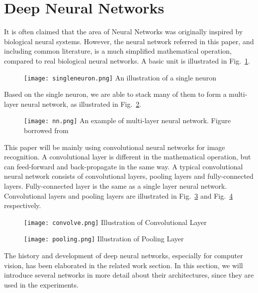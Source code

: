 \section{Deep Neural Networks}
It is often claimed that the area of Neural Networks was originally inspired by biological neural systems. However, the neural network referred in this paper, and including common literature, is a much simplified mathematical operation, compared to real biological neural networks. A basic unit is illustrated in Fig.~\ref{fig:singleneuron}.
\begin{figure}[!htp]
	\centering
	\texttt{[image: singleneuron.png]}
	{An illustration of a single neuron}
	\label{fig:singleneuron}
\end{figure}
Based on the single neuron, we are able to stack many of them to form a multi-layer neural network, as illustrated in Fig.~\ref{fig:nn}.
\begin{figure}[!htp]
	\centering
	\texttt{[image: nn.png]}
	{An example of multi-layer neural network. Figure borrowed from \cite{lecun2015deep}}
	\label{fig:nn}
\end{figure}
This paper will be mainly using convolutional neural networks for image recognition. A convolutional layer is different in the mathematical operation, but can feed-forward and back-propagate in the same way. A typical convolutional neural network consists of convolutional layers, pooling layers and fully-connected layers. Fully-connected layer is the same as a single layer neural network. Convolutional layers and pooling layers are illustrated in Fig.~\ref{fig:convolve} and Fig.~\ref{fig:pooling} respectively. 
\begin{figure}[!htp]
	\centering
	\texttt{[image: convolve.png]}
	{Illustration of Convolutional Layer}
	\label{fig:convolve}
\end{figure}
\begin{figure}[!htp]
	\centering
	\texttt{[image: pooling.png]}
	{Illustration of Pooling Layer}
	\label{fig:pooling}
\end{figure}

The history and development of deep neural networks, especially for computer vision, has been elaborated in the related work section. In this section, we will introduce several networks in more detail about their architectures, since they are used in the experiments.

